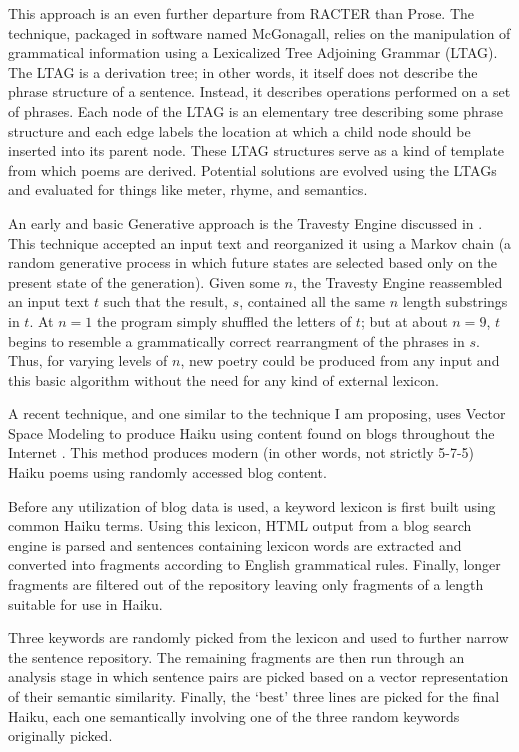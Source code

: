 \documentclass[10pt]{article}
\begin{document}
This approach is an even further departure from RACTER than Prose. The
technique, packaged in software named McGonagall, relies on the manipulation of
grammatical information using a Lexicalized Tree Adjoining Grammar (LTAG). The
LTAG is a derivation tree; in other words, it itself does not describe the
phrase structure of a sentence. Instead, it describes operations performed on a
set of phrases. Each node of the LTAG is an elementary tree describing some
phrase structure and each edge labels the location at which a child node should
be inserted into its parent node. These LTAG structures serve as a kind of
template from which poems are derived. Potential solutions are evolved using
the LTAGs and evaluated for things like meter, rhyme, and semantics.

An early and basic Generative approach is the Travesty Engine discussed in
\cite{Hart96}. This technique accepted an input text and reorganized it using a
Markov chain (a random generative process in which future states are selected
based only on the present state of the generation). Given some $n$, the
Travesty Engine reassembled an input text $t$ such that the result, $s$,
contained all the same $n$ length substrings in $t$. At $n = 1$ the program
simply shuffled the letters of $t$; but at about $n = 9$, $t$ begins to
resemble a grammatically correct rearrangment of the phrases in $s$. Thus, for
varying levels of $n$, new poetry could be produced from any input and this
basic algorithm without the need for any kind of external lexicon.

A recent technique, and one similar to the technique I am proposing, uses
Vector Space Modeling to produce Haiku using content found on blogs throughout
the Internet \cite{Wong08}. This method produces modern (in other words, not
strictly 5-7-5) Haiku poems using randomly accessed blog content. 

Before any utilization of blog data is used, a keyword lexicon is first built
using common Haiku terms. Using this lexicon, HTML output from a blog search
engine is parsed and sentences containing lexicon words are extracted and
converted into fragments according to English grammatical rules. Finally, longer
fragments are filtered out of the repository leaving only fragments of a length
suitable for use in Haiku.

Three keywords are randomly picked from the lexicon and used to further narrow
the sentence repository. The remaining fragments are then run through an
analysis stage in which sentence pairs are picked based on a vector
representation of their semantic similarity. Finally, the `best' three lines
are picked for the final Haiku, each one semantically involving one of the
three random keywords originally picked.
\end{document}
